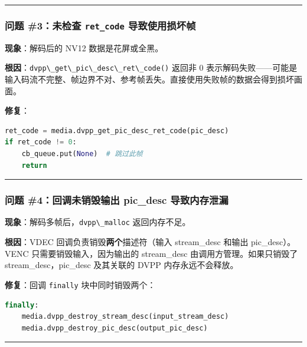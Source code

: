 \begin{center}\rule{0.5\linewidth}{0.5pt}\end{center}

\subsubsection{\texorpdfstring{问题 \#3：未检查 \texttt{ret\_code}
导致使用损坏帧}{问题 \#3：未检查 ret\_code 导致使用损坏帧}}\label{src-book-chapter6-h71}

\textbf{现象}：解码后的 NV12 数据是花屏或全黑。

\textbf{根因}：\passthrough{\lstinline!dvpp\_get\_pic\_desc\_ret\_code()!}
返回非 0
表示解码失败------可能是输入码流不完整、帧边界不对、参考帧丢失。直接使用失败帧的数据会得到损坏画面。

\textbf{修复}：

\begin{lstlisting}[language=Python]
ret_code = media.dvpp_get_pic_desc_ret_code(pic_desc)
if ret_code != 0:
    cb_queue.put(None)  # 跳过此帧
    return
\end{lstlisting}

\begin{center}\rule{0.5\linewidth}{0.5pt}\end{center}

\subsubsection{问题 \#4：回调未销毁输出 pic\_desc
导致内存泄漏}\label{src-book-chapter6-h72}

\textbf{现象}：解码多帧后，\passthrough{\lstinline!dvpp\_malloc!}
返回内存不足。

\textbf{根因}：VDEC 回调负责销毁\textbf{两个}描述符（输入 stream\_desc
和输出 pic\_desc）。VENC 只需要销毁输入，因为输出的 stream\_desc
由调用方管理。如果只销毁了 stream\_desc，pic\_desc 及其关联的 DVPP
内存永远不会释放。

\textbf{修复}：回调 \passthrough{\lstinline!finally!} 块中同时销毁两个：

\begin{lstlisting}[language=Python]
finally:
    media.dvpp_destroy_stream_desc(input_stream_desc)
    media.dvpp_destroy_pic_desc(output_pic_desc)
\end{lstlisting}

\begin{center}\rule{0.5\linewidth}{0.5pt}\end{center}

